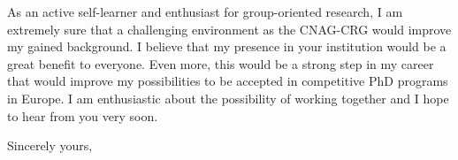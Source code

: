 \documentclass{letter} 					%
\begin{document}
\begin{letter}
\noindent 
As an active self-learner and enthusiast for group-oriented research, I am extremely sure that a challenging environment as the CNAG-CRG would improve my gained background.
I believe that my presence in your institution would be a great benefit to everyone. 
Even more, this would be a strong step in my career that would improve my possibilities to be accepted in competitive PhD programs in Europe.
I am enthusiastic about the possibility of working together and I hope to hear from you very soon.
 
\closing{Sincerely yours,} 
  

%
%
%
%
%
%
%



\end{letter}
\end{document}

